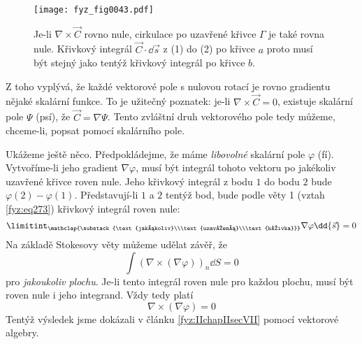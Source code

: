    \begin{figure}[ht!]  %
      \centering
      \texttt{[image: fyz\_fig0043.pdf]}
      \caption{Je-li \(\nabla\times\vec{C}\) rovno nule, cirkulace po uzavřené křivce \(\Gamma\)   
        je také rovna nule. Křivkový integrál \(\vec{C}\cdot\dd{\vec{s}}\) z (1) do (2) po 
        křivce \(a\) proto musí být stejný jako tentýž křivkový integrál po křivce \(b\).}
      \label{fyz:fig0043}
    \end{figure}
    Z toho vyplývá, že každé vektorové pole s nulovou rotací je rovno gradientu nějaké skalární 
    funkce. To je užitečný poznatek: je-li \(\nabla\times\vec{C}=0\), existuje skalární pole 
    \(\Psi\) (psí), že \(\vec{C}=\nabla\Psi\). Tento zvláštní druh vektorového pole tedy můžeme, 
    chceme-li, popsat pomocí skalárního pole.
    
    Ukážeme ještě něco. Předpokládejme, že máme \emph{libovolné} skalární pole \(\varphi\) (fí). 
    Vytvoříme-li jeho gradient \(\nabla\varphi\), musí být integrál tohoto vektoru po jakékoliv 
    uzavřené křivce  roven nule. Jeho křivkový integrál z bodu \(1\) do bodu \(2\) bude 
    \(\varphi(2) - \varphi(1)\). Představují-li \(1\) a \(2\) tentýž bod, bude podle věty 1 (vztah 
    \ref{fyz:eq273}) křivkový integrál roven nule:
    \begin{equation}\label{fyz:eq359}
      \limitint_{\mathclap{\substack{\text{jakákoliv}\\\text{uzavřená}\\\text{křivka}}}}
        \nabla\varphi\dd{\vec{s}} = 0
    \end{equation}
    Na základě Stokesovy věty můžeme udělat závěř, že 
    \begin{equation}\label{fyz:eq_fey_null0} 
      \int(\nabla\times(\nabla\varphi))_n\dd{S} = 0
    \end{equation} 
    pro \emph{jakoukoliv plochu}. Je-li tento integrál roven nule pro každou plochu, musí být 
    roven nule i jeho integrand. Vždy tedy platí
    \begin{equation}
      \nabla\times(\nabla\varphi) = 0
    \end{equation}
    Tentýž výsledek jsme dokázali v článku \ref{fyz:IIchapIIsecVII} pomocí vektorové algebry.      
    
